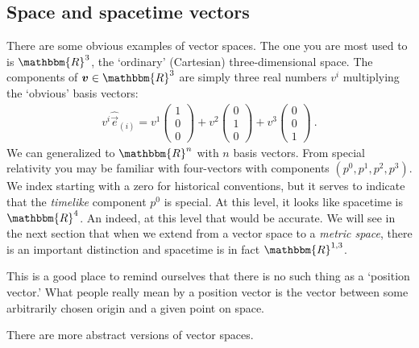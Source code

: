 \documentclass[
  11pt,
	colorful,
	raggedright,
]{tufte-style-thesis-flip}
\begin{document}
\subsection{Space and spacetime vectors}
There are some obvious examples of vector spaces. The one you are most used to is $\mathbbm{R}^3$, the `ordinary' (Cartesian) three-dimensional space. The components of $\vec{v}\in \mathbbm{R}^3$ are simply three real numbers $v^i$ multiplying the `obvious' basis vectors:
\begin{align}
   v^i \hat{\vec{e}}_{(i)} 
   = 
   v^1 
   \begin{pmatrix}
     1 \\ 0 \\ 0
   \end{pmatrix}
   +
   v^2 
   \begin{pmatrix}
     0 \\ 1 \\ 0
   \end{pmatrix}
   +v^3 
   \begin{pmatrix}
     0 \\ 0 \\ 1
   \end{pmatrix} \ .
 \end{align}
 We can generalized to $\mathbbm{R}^n$ with $n$ basis vectors. From special relativity you may be familiar with four-vectors with components $(p^0, p^1, p^2, p^3)$. We index starting with a zero for historical conventions, but it serves to indicate that the \emph{timelike} component $p^0$ is special. At this level, it looks like spacetime is $\mathbbm{R}^4$. An indeed, at this level that would be accurate. We will see in the next section that when we extend from a vector space to a \emph{metric space}, there is an important distinction and spacetime is in fact $\mathbbm{R}^{1,3}$.

This is a good place to remind ourselves that there is no such thing as a `position vector.' What people really mean by a position vector is the vector between some arbitrarily chosen origin and a given point on space.


There are more abstract versions of vector spaces.
\end{document}
